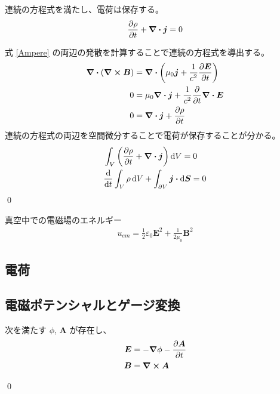 \documentclass[uplatex,dvipdfmx,a4paper,11pt]{jlreq}
\makeatletter
\newcommand{\EE}{\bm{E}}
\newcommand{\BB}{\bm{B}}
\renewcommand{\AA}{\bm{A}}
\theoremstyle{definition}
\renewenvironment{proof}[1][\proofname]{\par
  \normalfont
  \topsep6\p@\@plus6\p@ \trivlist
  \item[\hskip\labelsep{\bfseries #1}\@addpunct{\bfseries}]\ignorespaces\quad\par
}{%
  \qed\endtrivlist\@endpefalse
}
\renewcommand\proofname{証明}
\makeatother
\begin{document}
\begin{theorem}
  連続の方程式を満たし、電荷は保存する。
  \begin{align}
    \pdv{\rho}{t} + \vnabla\vdot\bm{j} = 0
  \end{align}
\end{theorem}
\begin{proof}
  式 \eqref{Ampere} の両辺の発散を計算することで連続の方程式を導出する。
  \begin{align}
    \vnabla\vdot(\vnabla\cross\BB) & = \vnabla\vdot\qty(\mu_0\bm{j} + \frac{1}{c^2}\pdv{\EE}{t})     \\
    0                              & = \mu_0\vnabla\vdot\bm{j} + \frac{1}{c^2}\pdv{t}\vnabla\vdot\EE \\
    0                              & = \vnabla\vdot\bm{j} + \pdv{\rho}{t}
  \end{align}
  連続の方程式の両辺を空間微分することで電荷が保存することが分かる。
  \begin{align}
     & \int_V\qty(\pdv{\rho}{t} + \vnabla\vdot\bm{j})\dd{V} = 0             \\
     & \dv{t}\int_V\rho\dd{V} + \int_{\partial V}\bm{j}\vdot\dd{\bm{S}} = 0
  \end{align}
\end{proof}

\begin{theorem}
  真空中での電磁場のエネルギー
  \begin{align}
    u_{em} = \frac{1}{2}\varepsilon_0\EE^2 + \frac{1}{2\mu_0}\BB^2
  \end{align}
\end{theorem}

\subsection{電荷}

\subsection{電磁ポテンシャルとゲージ変換}
\begin{theorem}[電位とベクトルポテンシャル]
  次を満たす $\phi$, $\AA$ が存在し、
  \begin{align}
    \EE & = - \vnabla\phi - \pdv{\AA}{t} \\
    \BB & = \vnabla\cross\AA
  \end{align}
\end{theorem}
\begin{proof}
\end{proof}
\end{document}
